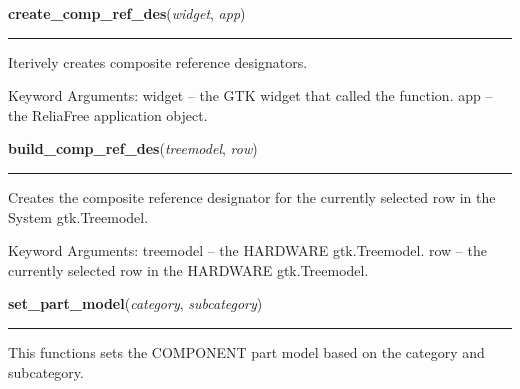 \hspace{.8\funcindent}\begin{boxedminipage}{\funcwidth}

    \raggedright \textbf{create\_comp\_ref\_des}(\textit{widget}, \textit{app})

    \vspace{-1.5ex}

    \rule{\textwidth}{0.5\fboxrule}
\setlength{\parskip}{2ex}
    Iterively creates composite reference designators.

    Keyword Arguments: widget -- the GTK widget that called the function. 
    app    -- the ReliaFree application object.

\setlength{\parskip}{1ex}
    \end{boxedminipage}

    \label{reliafree:utilities:build_comp_ref_des}

    \vspace{0.5ex}

\hspace{.8\funcindent}\begin{boxedminipage}{\funcwidth}

    \raggedright \textbf{build\_comp\_ref\_des}(\textit{treemodel}, \textit{row})

    \vspace{-1.5ex}

    \rule{\textwidth}{0.5\fboxrule}
\setlength{\parskip}{2ex}
    Creates the composite reference designator for the currently selected 
    row in the System gtk.Treemodel.

    Keyword Arguments: treemodel -- the HARDWARE gtk.Treemodel. row       
    -- the currently selected row in the HARDWARE gtk.Treemodel.

\setlength{\parskip}{1ex}
    \end{boxedminipage}

    \label{reliafree:utilities:set_part_model}

    \vspace{0.5ex}

\hspace{.8\funcindent}\begin{boxedminipage}{\funcwidth}

    \raggedright \textbf{set\_part\_model}(\textit{category}, \textit{subcategory})

    \vspace{-1.5ex}

    \rule{\textwidth}{0.5\fboxrule}
\setlength{\parskip}{2ex}
    This functions sets the COMPONENT part model based on the category and 
    subcategory.

\setlength{\parskip}{1ex}
    \end{boxedminipage}

